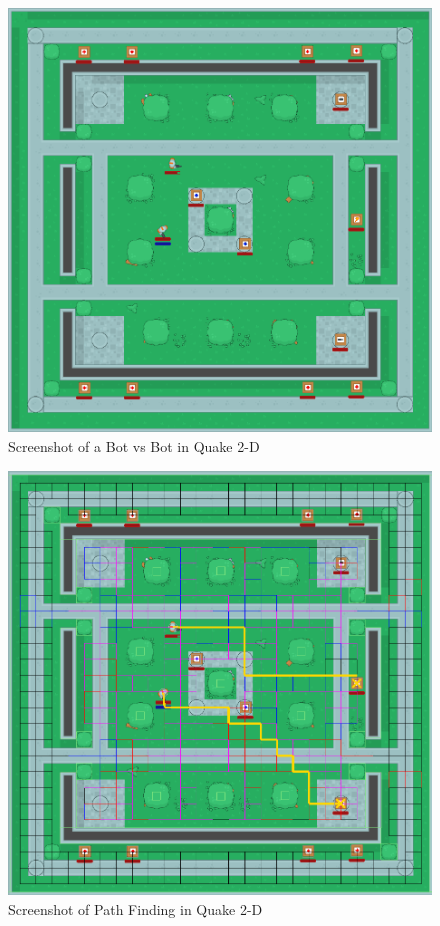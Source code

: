 \documentclass[a4paper, twocolumn]{article}
\begin{document}
        \begin{figure}[H]
            \centering
            \includegraphics[width=\linewidth]{share/screenshot.png}
            \caption{Screenshot of a Bot vs Bot in Quake 2-D}
            \label{fig:behaviour_tree_screenshot}
        \end{figure}

        \begin{figure}[H]
            \centering
            \includegraphics[width=\linewidth]{share/path_finding_screenshot.png}
            \caption{Screenshot of Path Finding in Quake 2-D}
            \label{fig:path_finding_screenshot}
        \end{figure}
\end{document}
